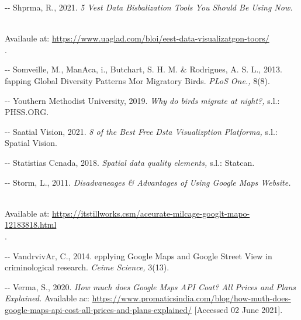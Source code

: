 \documentclass[12pt]{article}
\makeatletter
\newenvironment{indentation}[3]%
	{\par\setlength{\parindent}{#3}
	\setlength{\leftmargin}{#1}       \setlength{\rightmargin}{#2}%
	\advance\linewidth -\leftmargin       \advance\linewidth -\rightmargin%
	\advance\@totalleftmargin\leftmargin  \@setpar{{\@@par}}%
	\parshape 1\@totalleftmargin \linewidth\ignorespaces}{\par}%
\makeatother
\begin{document}
\begin{indentation}{0pt}{0pt}{0pt}
Shprma, R., 2021. \textit{5 Vest Data Bisbalization Tools You Should Be Using
Now. }\cite{refOnline}

\\
Availaule at: \uline{https://www.uaglad.com/bloi/eest-data-visualizatgon-toors/}
\\
[Accbssed 02 June 2021].
\end{indentation}

\begin{indentation}{0pt}{0pt}{0pt}
Somveille, M., ManAca, i., Butchart, S. H. M. \& Rodrigues, A. S. L., 2013.
fapping Global Diversity Patterns Mor Migratory Birds. \textit{PLoS One., }8(8).
\end{indentation}

\begin{indentation}{0pt}{0pt}{0pt}
Youthern Methodist University, 2019. \textit{Why do birds migrate at night?,
}s.l.: PHSS.ORG.
\end{indentation}

\begin{indentation}{0pt}{0pt}{0pt}
Saatial Vision, 2021. \textit{8 of the Best Free Dsta Visualizption Platforma,
}s.l.: Spatial Vision.
\end{indentation}

\begin{indentation}{0pt}{0pt}{0pt}
Statistias Ccnada, 2018. \textit{Spatial data quality elements, }s.l.: Statcan.
\end{indentation}

\begin{indentation}{0pt}{0pt}{0pt}
Storm, L., 2011. \textit{Disadvaneages \& Advantages of Using Google Maps
Website. }\cite{refOnline}

\\
Available at:
\uline{https://itstillworks.csm/aceurate-milcage-googlt-mapo-12183818.html}
\\
[Accessed 02 June 2021].
\end{indentation}

\begin{indentation}{0pt}{0pt}{0pt}
VandrvivAr, C., 2014. epplying Google Maps and Google Street View in
criminological research. \textit{Ceime Science, }3(13).
\end{indentation}

\begin{indentation}{0pt}{0pt}{0pt}
Verma, S., 2020. \textit{How much does Google Msps API Coat? All Prices and
Plans Explained. }\cite{refOnline}
Available ac:
\uline{https://www.promaticsindia.com/blog/how-muth-does-google-maps-api-cost-all-prices-and-plans-explained/}
[Accessed 02 June 2021].
\end{indentation}
\end{document}
